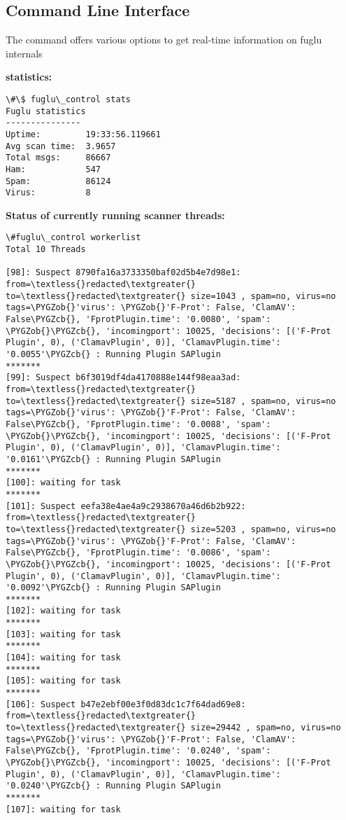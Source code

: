 \documentclass[letterpaper,10pt,english]{sphinxmanual}
\def\PYGZob{\char`\{}
\def\PYGZcb{\char`\}}
\begin{document}
\subsection{Command Line Interface}
\label{operation-index:command-line-interface}
The  command offers various options to get real-time information on fuglu internals

\textbf{statistics:}

\begin{Verbatim}[commandchars=\\\{\}]
\#\$ fuglu\_control stats
Fuglu statistics
---------------
Uptime:         19:33:56.119661
Avg scan time:  3.9657
Total msgs:     86667
Ham:            547
Spam:           86124
Virus:          8
\end{Verbatim}

\textbf{Status of currently running scanner threads:}

\begin{Verbatim}[commandchars=\\\{\}]
\#fuglu\_control workerlist
Total 10 Threads

[98]: Suspect 8790fa16a3733350baf02d5b4e7d98e1: from=\textless{}redacted\textgreater{} to=\textless{}redacted\textgreater{} size=1043 , spam=no, virus=no tags=\PYGZob{}'virus': \PYGZob{}'F-Prot': False, 'ClamAV': False\PYGZcb{}, 'FprotPlugin.time': '0.0080', 'spam': \PYGZob{}\PYGZcb{}, 'incomingport': 10025, 'decisions': [('F-Prot Plugin', 0), ('ClamavPlugin', 0)], 'ClamavPlugin.time': '0.0055'\PYGZcb{} : Running Plugin SAPlugin
*******
[99]: Suspect b6f3019df4da4170888e144f98eaa3ad: from=\textless{}redacted\textgreater{} to=\textless{}redacted\textgreater{} size=5187 , spam=no, virus=no tags=\PYGZob{}'virus': \PYGZob{}'F-Prot': False, 'ClamAV': False\PYGZcb{}, 'FprotPlugin.time': '0.0088', 'spam': \PYGZob{}\PYGZcb{}, 'incomingport': 10025, 'decisions': [('F-Prot Plugin', 0), ('ClamavPlugin', 0)], 'ClamavPlugin.time': '0.0161'\PYGZcb{} : Running Plugin SAPlugin
*******
[100]: waiting for task
*******
[101]: Suspect eefa38e4ae4a9c2938670a46d6b2b922: from=\textless{}redacted\textgreater{} to=\textless{}redacted\textgreater{} size=5203 , spam=no, virus=no tags=\PYGZob{}'virus': \PYGZob{}'F-Prot': False, 'ClamAV': False\PYGZcb{}, 'FprotPlugin.time': '0.0086', 'spam': \PYGZob{}\PYGZcb{}, 'incomingport': 10025, 'decisions': [('F-Prot Plugin', 0), ('ClamavPlugin', 0)], 'ClamavPlugin.time': '0.0092'\PYGZcb{} : Running Plugin SAPlugin
*******
[102]: waiting for task
*******
[103]: waiting for task
*******
[104]: waiting for task
*******
[105]: waiting for task
*******
[106]: Suspect b47e2ebf00e3f0d83dc1c7f64dad69e8: from=\textless{}redacted\textgreater{} to=\textless{}redacted\textgreater{} size=29442 , spam=no, virus=no tags=\PYGZob{}'virus': \PYGZob{}'F-Prot': False, 'ClamAV': False\PYGZcb{}, 'FprotPlugin.time': '0.0240', 'spam': \PYGZob{}\PYGZcb{}, 'incomingport': 10025, 'decisions': [('F-Prot Plugin', 0), ('ClamavPlugin', 0)], 'ClamavPlugin.time': '0.0240'\PYGZcb{} : Running Plugin SAPlugin
*******
[107]: waiting for task
\end{Verbatim}
\end{document}
